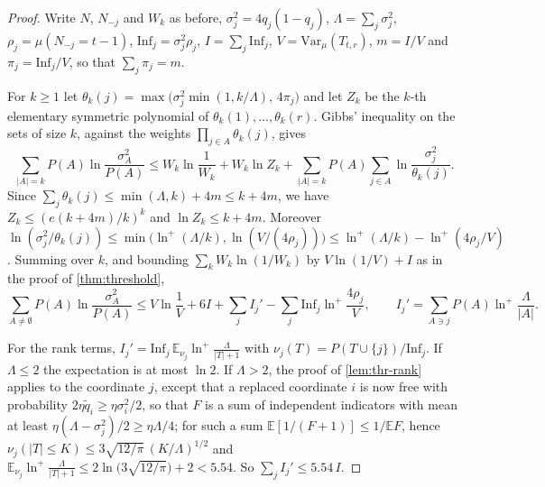 \documentclass[11pt]{amsart}
\theoremstyle{definition}
\theoremstyle{remark}
\newcommand{\E}{\mathbb{E}}
\newcommand{\Inf}{\mathrm{Inf}}
\newcommand{\Var}{\mathrm{Var}}
\begin{document}
\begin{proof}
Write $N$, $N_{-j}$ and $W_k$ as before, $\sigma_j^2=4q_j(1-q_j)$, $\Lambda=\sum_j\sigma_j^2$,
$\rho_j=\mu(N_{-j}=t-1)$, $\Inf_j=\sigma_j^2\rho_j$, $I=\sum_j\Inf_j$, $V=\Var_\mu(T_{t,r})$, $m=I/V$ and
$\pi_j=\Inf_j/V$, so that $\sum_j\pi_j=m$.

For $k\ge1$ let $\theta_k(j)=\max\bigl(\sigma_j^2\min(1,k/\Lambda),\,4\pi_j\bigr)$ and let $Z_k$ be the $k$-th elementary
symmetric polynomial of $\theta_k(1),\dots,\theta_k(r)$. Gibbs' inequality on the sets of size $k$, against the weights
$\prod_{j\in A}\theta_k(j)$, gives
\[
\sum_{|A|=k}P(A)\ln\frac{\sigma_A^2}{P(A)}\le W_k\ln\frac1{W_k}+W_k\ln Z_k+\sum_{|A|=k}P(A)\sum_{j\in A}\ln\frac{\sigma_j^2}{\theta_k(j)}.
\]
Since $\sum_j\theta_k(j)\le\min(\Lambda,k)+4m\le k+4m$, we have $Z_k\le(e(k+4m)/k)^k$ and $\ln Z_k\le k+4m$. Moreover
$\ln(\sigma_j^2/\theta_k(j))\le\min\bigl(\ln^+(\Lambda/k),\ln(V/(4\rho_j))\bigr)\le\ln^+(\Lambda/k)-\ln^+(4\rho_j/V)$.
Summing over $k$, and bounding $\sum_kW_k\ln(1/W_k)$ by $V\ln(1/V)+I$ as in the proof of \cref{thm:threshold},
\[
\sum_{A\ne\emptyset}P(A)\ln\frac{\sigma_A^2}{P(A)}\le V\ln\frac1V+6I+\sum_jI_j'-\sum_j\Inf_j\ln^+\frac{4\rho_j}V,
\qquad I_j'=\sum_{A\ni j}P(A)\ln^+\frac\Lambda{|A|}.
\]

For the rank terms, $I_j'=\Inf_j\,\E_{\nu_j}\ln^+\frac\Lambda{|T|+1}$ with $\nu_j(T)=P(T\cup\{j\})/\Inf_j$. If
$\Lambda\le2$ the expectation is at most $\ln2$. If $\Lambda>2$, the proof of \cref{lem:thr-rank} applies to the
coordinate $j$, except that a replaced coordinate $i$ is now free with probability $2\eta\tilde q_i\ge\eta\sigma_i^2/2$,
so that $F$ is a sum of independent indicators with mean at least $\eta(\Lambda-\sigma_j^2)/2\ge\eta\Lambda/4$; for
such a sum $\E[1/(F+1)]\le1/\E F$, hence $\nu_j(|T|\le K)\le3\sqrt{12/\pi}\,(K/\Lambda)^{1/2}$ and
$\E_{\nu_j}\ln^+\frac\Lambda{|T|+1}\le2\ln\bigl(3\sqrt{12/\pi}\bigr)+2<5.54$. So $\sum_jI_j'\le5.54\,I$.


\end{proof}
\end{document}
